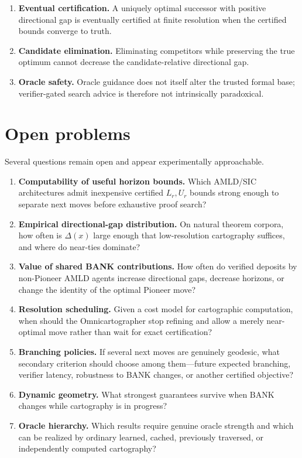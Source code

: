 \documentclass[11pt]{article}
\theoremstyle{definition}
\theoremstyle{remark}
\newcommand{\BANK}{\mathrm{BANK}}
\newcommand{\Gap}{\Delta}
\begin{document}
\begin{enumerate}
\item \textbf{Eventual certification.}
A uniquely optimal successor with positive directional gap is eventually certified at finite resolution when the certified bounds converge to truth.

\item \textbf{Candidate elimination.}
Eliminating competitors while preserving the true optimum cannot decrease the candidate-relative directional gap.

\item \textbf{Oracle safety.}
Oracle guidance does not itself alter the trusted formal base; verifier-gated search advice is therefore not intrinsically paradoxical.
\end{enumerate}

\section{Open problems}
Several questions remain open and appear experimentally approachable.

\begin{enumerate}
\item \textbf{Computability of useful horizon bounds.} Which AMLD/SIC architectures admit inexpensive certified $L_r,U_r$ bounds strong enough to separate next moves before exhaustive proof search?

\item \textbf{Empirical directional-gap distribution.} On natural theorem corpora, how often is $\Gap(x)$ large enough that low-resolution cartography suffices, and where do near-ties dominate?

\item \textbf{Value of shared BANK contributions.} How often do verified deposits by non-Pioneer AMLD agents increase directional gaps, decrease horizons, or change the identity of the optimal Pioneer move?

\item \textbf{Resolution scheduling.} Given a cost model for cartographic computation, when should the Omnicartographer stop refining and allow a merely near-optimal move rather than wait for exact certification?

\item \textbf{Branching policies.} If several next moves are genuinely geodesic, what secondary criterion should choose among them---future expected branching, verifier latency, robustness to BANK changes, or another certified objective?

\item \textbf{Dynamic geometry.} What strongest guarantees survive when $\BANK$ changes while cartography is in progress?

\item \textbf{Oracle hierarchy.} Which results require genuine oracle strength and which can be realized by ordinary learned, cached, previously traversed, or independently computed cartography?
\end{enumerate}
\end{document}
